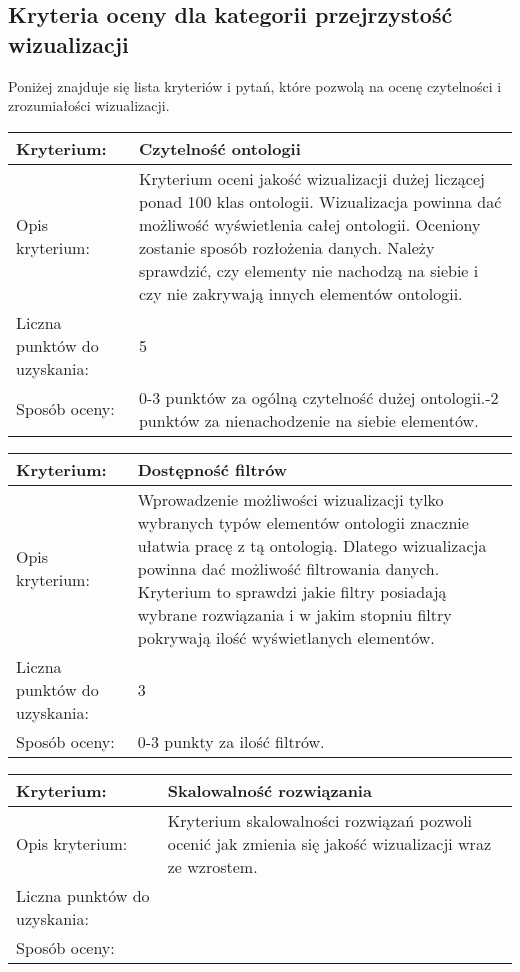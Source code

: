 \subsection*{Kryteria oceny dla kategorii przejrzystość wizualizacji}
Poniżej znajduje się lista kryteriów i pytań, które pozwolą na ocenę czytelności i zrozumiałości wizualizacji. 


\begin{longtable}{|m{3cm}|m{10cm}|}\hline
Kryterium:                   & \bf{ Czytelność ontologii }\\ \hline
Opis kryterium:              &  Kryterium oceni jakość wizualizacji dużej liczącej ponad 100 klas ontologii. Wizualizacja powinna dać możliwość 
                                wyświetlenia całej ontologii.  Oceniony zostanie sposób rozłożenia 
                                 danych. Należy sprawdzić, czy elementy nie nachodzą na siebie i czy nie zakrywają innych elementów ontologii. 
                                \\ \hline
Liczna punktów do uzyskania: &  5   \\ \hline
Sposób oceny:                &  0-3 punktów za ogólną czytelność dużej ontologii.\newline
                                0-2 punktów za nienachodzenie na siebie elementów. \\ \hline
\end{longtable}

\begin{longtable}{|m{3cm}|m{10cm}|}\hline
Kryterium:                   & \bf{ Dostępność filtrów }\\ \hline
Opis kryterium:              &  Wprowadzenie możliwości wizualizacji tylko wybranych typów elementów ontologii znacznie ułatwia pracę z tą ontologią.
                                Dlatego wizualizacja powinna dać możliwość filtrowania danych. Kryterium to sprawdzi jakie filtry posiadają wybrane 
                                rozwiązania i w jakim stopniu filtry pokrywają ilość wyświetlanych elementów.\\ \hline
Liczna punktów do uzyskania: &  3   \\ \hline
Sposób oceny:                &  0-3 punkty za ilość filtrów.    \\ \hline
\end{longtable}

\begin{longtable}{|m{3cm}|m{10cm}|}\hline
Kryterium:                   & \bf{ Skalowalność rozwiązania }\\ \hline
Opis kryterium:              & Kryterium skalowalności rozwiązań pozwoli ocenić jak zmienia się jakość wizualizacji wraz ze wzrostem.  \\ \hline
Liczna punktów do uzyskania: &     \\ \hline
Sposób oceny:                &     \\ \hline
\end{longtable}


